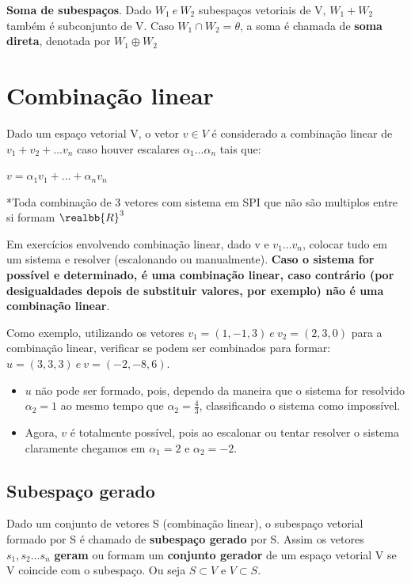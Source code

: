 \documentclass[letterpaper, 11pt]{article}
\begin{document}
\textbf{Soma de subespaços}. Dado \(W_1 \  e \  W_2\) subespaços vetoriais de V, \(W_1 + W_2\) também é subconjunto de V. Caso \(W_1 \cap W_2 = \theta\), a soma é chamada de \textbf{soma direta}, denotada por \(W_1 \oplus W_2\)


\section{Combinação linear}
\label{sec:orgff4212c}
Dado um espaço vetorial V, o vetor \(v \in V\) é considerado a combinação linear de \(v_1 + v_2 + ... v_n\) caso houver escalares \(\alpha_1 ... \alpha_n\) tais que:

\begin{center} $v = \alpha_1v_1 + ... + \alpha_nv_n$ \end{center}

*Toda combinação de 3 vetores com sistema em SPI que não são multiplos entre si formam \(\realbb{R}^3\)

Em exercícios envolvendo combinação linear, dado v e \(v_1 ... v_n\), colocar tudo em um sistema e resolver (escalonando ou manualmente). \textbf{Caso o sistema for possível e determinado, é uma combinação linear,
caso contrário (por desigualdades depois de substituir valores, por exemplo) não é uma combinação linear}.

Como exemplo, utilizando os vetores \(v_1 = (1,-1,3) \ e \ v_2 = (2,3,0)\) para a combinação linear, verificar se podem ser combinados para formar: \(u = (3,3,3) \ e \ v=(-2,-8,6)\).

\begin{itemize}
\item \(u\) não pode ser formado, pois, dependo da maneira que o sistema for resolvido \(\alpha_2 = 1\) ao mesmo tempo que \(\alpha_2 = \frac{4}{3}\), classificando o sistema como impossível.

\item Agora, \(v\) é totalmente possível, pois ao escalonar ou tentar resolver o sistema claramente chegamos em \(\alpha_1 = 2\) e \(\alpha_2 = -2\).
\end{itemize}

\subsection{Subespaço gerado}
\label{sec:orge7d8bc9}

Dado um conjunto de vetores S (combinação linear), o subespaço vetorial formado por S é chamado de \textbf{subespaço gerado} por S. Assim os vetores \(s_1, s_2 ... s_n\) \textbf{geram} ou formam um \textbf{conjunto gerador}
de um espaço vetorial V se V coincide com o subespaço. Ou seja \(S \subset V\) e \(V \subset S\).
\end{document}
